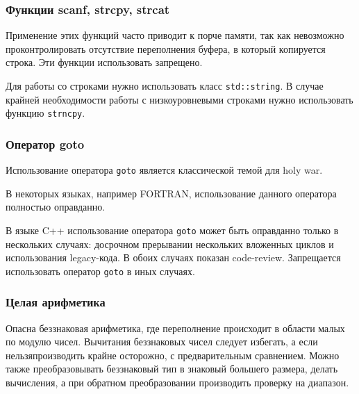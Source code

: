 {{{%
\subsubsection{Функции scanf, strcpy, strcat}

Применение этих функций часто приводит к порче памяти, так как невозможно проконтролировать отсутствие переполнения буфера, в который копируется строка. Эти функции использовать запрещено.

Для работы со строками нужно использовать класс \lstinline|std::string|. В случае крайней необходимости работы с низкоуровневыми строками нужно использовать функцию \lstinline|strncpy|.

\subsubsection{Оператор goto}


Использование оператора \lstinline|goto| является классической темой для holy war.

В некоторых языках, например FORTRAN, использование данного оператора полностью оправданно.

В языке C++ использование оператора \lstinline|goto| может быть оправданно только в нескольких случаях: досрочном прерывании нескольких вложенных циклов и использования legacy-кода. В обоих случаях показан code-review. Запрещается использовать оператор \lstinline|goto| в иных случаях.

\subsubsection{Целая арифметика}

Опасна беззнаковая арифметика, где переполнение происходит в области малых по модулю чисел. Вычитания беззнаковых чисел следует избегать, а если нельзя\mdash производить крайне осторожно, с предварительным сравнением. Можно также преобразовывать беззнаковый тип в знаковый большего размера, делать вычисления, а при обратном преобразовании производить проверку на диапазон.

}}}
